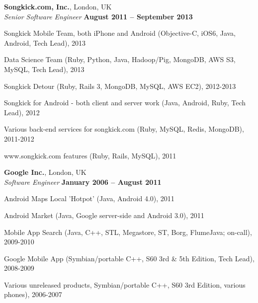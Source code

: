 \documentclass[line]{resume}
\begin{document}
\begin{resume}
    \textbf{Songkick.com, Inc.}, London, UK \vspace{2mm}\\\vspace{1mm}%
    \textsl{Senior Software Engineer} \hfill \textbf{August 2011 -- September 2013}\vspace{-3mm}\\\vspace{-1mm}%
    \begin{list2}
        \item Songkick Mobile Team, both iPhone and Android (Objective-C, iOS6, Java, Android, Tech Lead), 2013
        \item Data Science Team (Ruby, Python, Java, Hadoop/Pig, MongoDB, AWS S3, MySQL, Tech Lead), 2013
        \item Songkick Detour (Ruby, Rails 3, MongoDB, MySQL, AWS EC2), 2012-2013
        \item Songkick for Android - both client and server work (Java, Android, Ruby, Tech Lead), 2012
        \item Various back-end services for songkick.com (Ruby, MySQL, Redis, MongoDB), 2011-2012
        \item www.songkick.com features (Ruby, Rails, MySQL), 2011
    \end{list2}\vspace{-1.5mm}

    \textbf{Google Inc.}, London, UK \vspace{2mm}\\\vspace{1mm}%
    \textsl{Software Engineer} \hfill \textbf{January 2006 -- August 2011}\vspace{-3mm}\\\vspace{-1mm}%
    \begin{list2}
        \item Android Maps Local 'Hotpot' (Java,  Android 4.0), 2011
        \item Android Market (Java,  Google server-side and Android 3.0), 2011
        \item Mobile App Search (Java, C++, STL, Megastore, ST, Borg, FlumeJava; on-call), 2009-2010
        \item Google Mobile App (Symbian/portable C++, S60 3rd \& 5th Edition, Tech Lead), 2008-2009
        \item Various unreleased products, Symbian/portable C++, S60 3rd Edition, various phones), 2006-2007
    \end{list2}\vspace{-1.5mm}


\end{resume}
\end{document}
